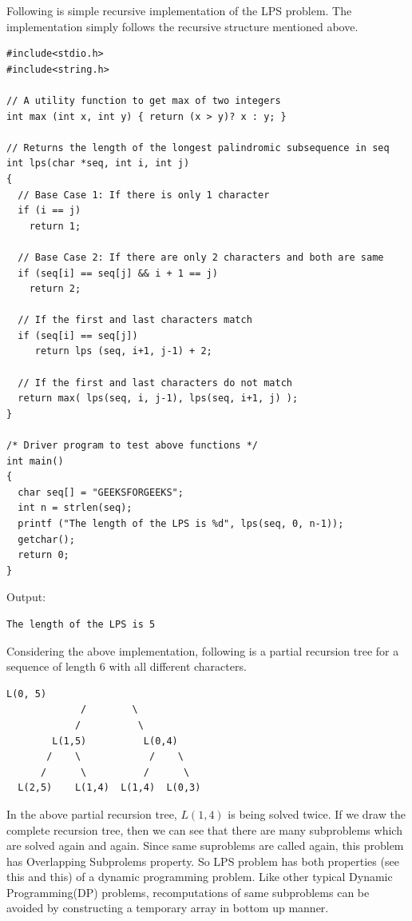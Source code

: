 
Following is simple recursive implementation of the LPS problem. The
implementation simply follows the recursive structure mentioned above.
\begin{lstlisting}[style=raycppnewsnippet]
#include<stdio.h>
#include<string.h>
 
// A utility function to get max of two integers
int max (int x, int y) { return (x > y)? x : y; }
 
// Returns the length of the longest palindromic subsequence in seq
int lps(char *seq, int i, int j)
{
  // Base Case 1: If there is only 1 character
  if (i == j)
    return 1;
 
  // Base Case 2: If there are only 2 characters and both are same
  if (seq[i] == seq[j] && i + 1 == j)
    return 2;
 
  // If the first and last characters match
  if (seq[i] == seq[j])
     return lps (seq, i+1, j-1) + 2;
 
  // If the first and last characters do not match
  return max( lps(seq, i, j-1), lps(seq, i+1, j) );
}
 
/* Driver program to test above functions */
int main()
{
  char seq[] = "GEEKSFORGEEKS";
  int n = strlen(seq);
  printf ("The length of the LPS is %d", lps(seq, 0, n-1));
  getchar();
  return 0;
}
\end{lstlisting}
Output:
\begin{lstlisting}[style=rayio]
The length of the LPS is 5
\end{lstlisting}
Considering the above implementation, following is a partial recursion tree
for a sequence of length 6 with all different characters.
\begin{lstlisting}[style=raygeneric]
               L(0, 5)
             /        \ 
            /          \  
        L(1,5)          L(0,4)
       /    \            /    \
      /      \          /      \
  L(2,5)    L(1,4)  L(1,4)  L(0,3)
\end{lstlisting}
In the above partial recursion tree, $L(1,4)$ is being solved twice. If we
draw the complete recursion tree, then we can see that there are many
subproblems which are solved again and again. Since same suproblems are
called again, this problem has Overlapping Subprolems property. So LPS
problem has both properties (see this and this) of a dynamic programming
problem. Like other typical Dynamic Programming(DP) problems, recomputations
of same subproblems can be avoided by constructing a temporary array
\ctt{L[][]} in bottom up manner.

